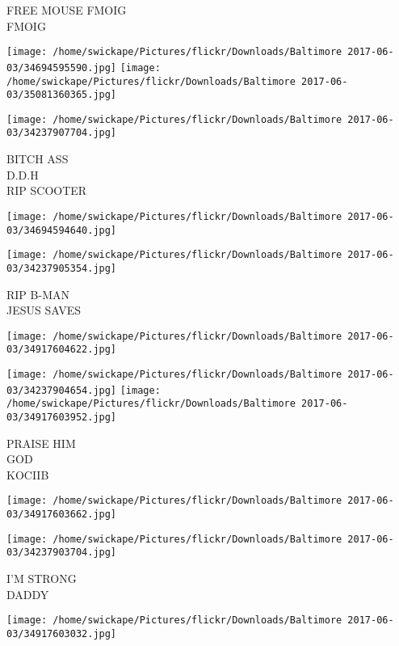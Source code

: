 \documentclass[10pt,letterpaper]{article}
\begin{document}
FREE MOUSE FMOIG\\
FMOIG\\
\pagebreak

\texttt{[image: /home/swickape/Pictures/flickr/Downloads/Baltimore 2017-06-03/34694595590.jpg]}
\texttt{[image: /home/swickape/Pictures/flickr/Downloads/Baltimore 2017-06-03/35081360365.jpg]}

\vspace{0.25in}
\texttt{[image: /home/swickape/Pictures/flickr/Downloads/Baltimore 2017-06-03/34237907704.jpg]}

BITCH ASS\\
D.D.H\\
RIP SCOOTER\\
\pagebreak

\texttt{[image: /home/swickape/Pictures/flickr/Downloads/Baltimore 2017-06-03/34694594640.jpg]}

\vspace{0.25in}
\texttt{[image: /home/swickape/Pictures/flickr/Downloads/Baltimore 2017-06-03/34237905354.jpg]}

RIP B{-}MAN\\
JESUS SAVES\\
\pagebreak

\texttt{[image: /home/swickape/Pictures/flickr/Downloads/Baltimore 2017-06-03/34917604622.jpg]}

\vspace{0.25in}
\texttt{[image: /home/swickape/Pictures/flickr/Downloads/Baltimore 2017-06-03/34237904654.jpg]}
\texttt{[image: /home/swickape/Pictures/flickr/Downloads/Baltimore 2017-06-03/34917603952.jpg]}

PRAISE HIM\\
GOD\\
KOCIIB\\
\pagebreak

\texttt{[image: /home/swickape/Pictures/flickr/Downloads/Baltimore 2017-06-03/34917603662.jpg]}

\vspace{0.25in}
\texttt{[image: /home/swickape/Pictures/flickr/Downloads/Baltimore 2017-06-03/34237903704.jpg]}

I'M STRONG\\
DADDY\\
\pagebreak

\texttt{[image: /home/swickape/Pictures/flickr/Downloads/Baltimore 2017-06-03/34917603032.jpg]}
\end{document}
